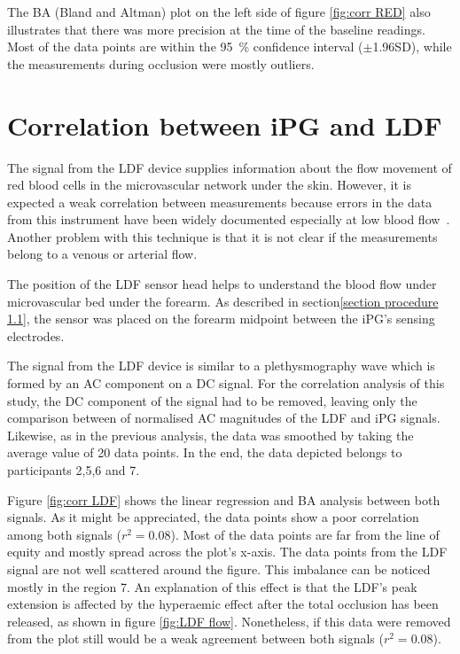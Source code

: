 The BA (Bland and Altman) plot on the left side of figure \ref{fig:corr RED} also illustrates that there was more precision at the time of the baseline readings. Most of the data points are within the \SI{95}{\percent} confidence interval ($\pm $1.96SD), while the measurements during occlusion were mostly outliers.

\section{Correlation between iPG and LDF}  %
\label{section correlation 4}
The signal from the LDF device supplies information about the flow movement of red blood cells in the microvascular network under the skin. However, it is expected a weak correlation between measurements because errors in the data from this instrument have been widely documented especially at low blood flow~\cite{perkash1988difficulties}. Another problem with this technique is that it is not clear if the measurements belong to a venous or arterial flow. 

The position of the LDF sensor head helps to understand the blood flow under microvascular bed under the forearm. As described in section\ref{section procedure 1.1}, the sensor was placed on the forearm midpoint between the iPG's sensing electrodes. 

The signal from the LDF device is similar to a plethysmography wave which is formed by an AC component on a DC signal. For the correlation analysis of this study, the DC component of the signal had to be removed, leaving only the comparison between of normalised AC magnitudes of the LDF and iPG signals. Likewise, as in the previous analysis, the data was smoothed by taking the average value of 20 data points. In the end, the data depicted belongs to participants 2,5,6 and 7.

Figure \ref{fig:corr LDF} shows the linear regression and  BA analysis between both signals. As it might be appreciated, the data points show a poor correlation among both signals ($r^2 = 0.08$). Most of the data points are far from the line of equity and mostly spread across the plot's x-axis. The data points from the LDF signal are not well scattered around the figure. This imbalance can be noticed mostly in the region 7.  An explanation of this effect is that the LDF's peak extension is affected by the hyperaemic effect after the total occlusion has been released, as shown in figure \ref{fig:LDF flow}. Nonetheless, if this data were removed from the plot still would be a weak agreement between both signals ($r^2 = 0.08$).

